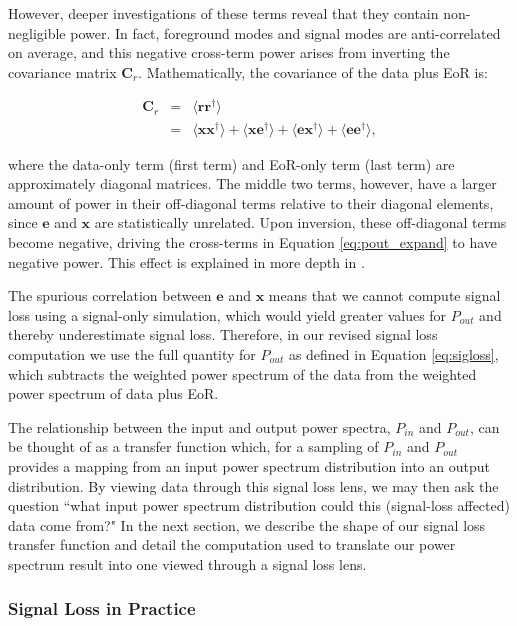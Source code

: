 \documentclass[preprint2,numberedappendix,tighten]{aastex6}  %
\begin{document}
However, deeper investigations of these terms reveal that they contain non-negligible power. In fact, foreground modes and signal modes are anti-correlated on average, and this negative cross-term power arises from inverting the covariance matrix $\textbf{C}_{r}$. Mathematically, the covariance of the data plus EoR is:

\begin{eqnarray}
\textbf{C}_{r} &=& \langle \textbf{rr}^{\dagger} \rangle \\
&=& \langle \textbf{xx}^{\dagger} \rangle + \langle \textbf{xe}^{\dagger} \rangle + \langle \textbf{ex}^{\dagger} \rangle + \langle \textbf{ee}^{\dagger} \rangle,
\end{eqnarray}

\noindent where the data-only term (first term) and EoR-only term (last term) are approximately diagonal matrices. The middle two terms, however, have a larger amount of power in their off-diagonal terms relative to their diagonal elements, since $\textbf{e}$ and $\textbf{x}$ are statistically unrelated. Upon inversion, these off-diagonal terms become negative, driving the cross-terms in Equation \ref{eq:pout_expand} to have negative power. This effect is explained in more depth in \citet{switzer_et_al2015}. 

The spurious correlation between $\textbf{e}$ and $\textbf{x}$ means that we cannot compute signal loss using a signal-only simulation, which would yield greater values for $P_{out}$ and thereby underestimate signal loss. Therefore, in our revised signal loss computation we use the full quantity for $P_{out}$ as defined in Equation \eqref{eq:sigloss}, which subtracts the weighted power spectrum of the data from the weighted power spectrum of data plus EoR. 

The relationship between the input and output power spectra, $P_{in}$ and $P_{out}$, can be thought of as a transfer function which, for a sampling of $P_{in}$ and $P_{out}$ provides a mapping from an input power spectrum distribution into an output distribution. By viewing data through this signal loss lens, we may then ask the question ``what input power spectrum distribution could this (signal-loss affected) data come from?" In the next section, we describe the shape of our signal loss transfer function and detail the computation used to translate our power spectrum result into one viewed through a signal loss lens.

\subsubsection{Signal Loss in Practice}
\end{document}
